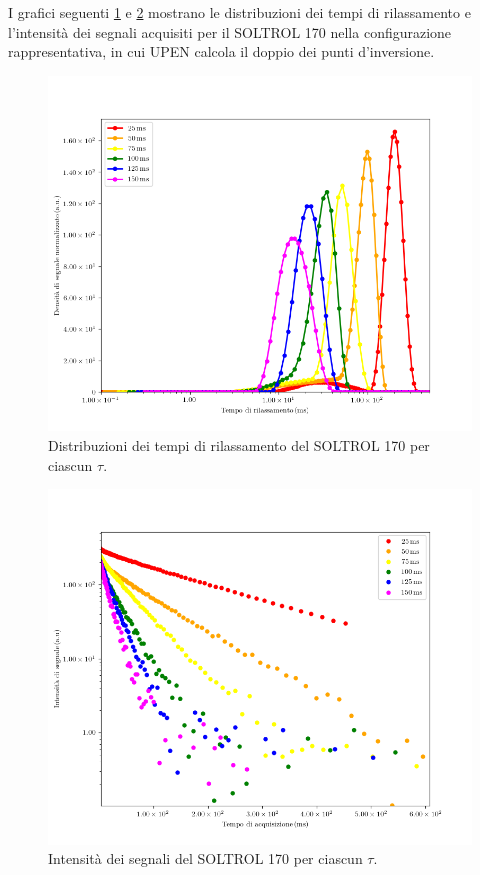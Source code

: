 I grafici seguenti \ref{fig:D_s170} e \ref{fig:S_s170} mostrano le distribuzioni dei tempi di rilassamento e l'intensità dei segnali acquisiti per il SOLTROL 170 nella configurazione rappresentativa, in cui UPEN calcola il doppio dei punti d'inversione.

\begin{figure}[h!]
\centering
\includegraphics[scale=0.3]{Figure/SOLTROL170.png}
\caption{Distribuzioni dei tempi di rilassamento del SOLTROL 170 per ciascun $\tau$.}
\label{fig:D_s170}
\end{figure}

\begin{figure}[h!]
\centering
\includegraphics[scale=0.3]{Figure/SOLTROL170_SigTSig.png}
\caption{Intensità dei segnali del SOLTROL 170 per ciascun $\tau$.}
\label{fig:S_s170}
\end{figure}

